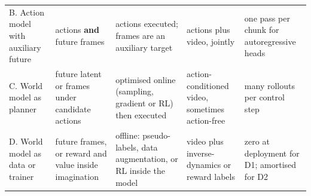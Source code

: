 \documentclass[
  10pt,
  english,
]{article}
\begin{document}
\begin{longtable}[]{@{}lllll@{}}
\begin{minipage}[t]{0.17\columnwidth}
B. Action model with auxiliary future\strut
\end{minipage} & \begin{minipage}[t]{0.17\columnwidth}\raggedright
actions \textbf{and} future frames\strut
\end{minipage} & \begin{minipage}[t]{0.17\columnwidth}\raggedright
actions executed; frames are an auxiliary target\strut
\end{minipage} & \begin{minipage}[t]{0.17\columnwidth}\raggedright
actions plus video, jointly\strut
\end{minipage} & \begin{minipage}[t]{0.17\columnwidth}\raggedright
one pass per chunk for autoregressive heads\strut
\end{minipage}\tabularnewline
\begin{minipage}[t]{0.17\columnwidth}\raggedright
C. World model as planner\strut
\end{minipage} & \begin{minipage}[t]{0.17\columnwidth}\raggedright
future latent or frames under candidate actions\strut
\end{minipage} & \begin{minipage}[t]{0.17\columnwidth}\raggedright
optimised online (sampling, gradient or RL) then executed\strut
\end{minipage} & \begin{minipage}[t]{0.17\columnwidth}\raggedright
action-conditioned video, sometimes action-free\strut
\end{minipage} & \begin{minipage}[t]{0.17\columnwidth}\raggedright
many rollouts per control step\strut
\end{minipage}\tabularnewline
\begin{minipage}[t]{0.17\columnwidth}\raggedright
D. World model as data or trainer\strut
\end{minipage} & \begin{minipage}[t]{0.17\columnwidth}\raggedright
future frames, or reward and value inside imagination\strut
\end{minipage} & \begin{minipage}[t]{0.17\columnwidth}\raggedright
offline: pseudo-labels, data augmentation, or RL inside the model\strut
\end{minipage} & \begin{minipage}[t]{0.17\columnwidth}\raggedright
video plus inverse-dynamics or reward labels\strut
\end{minipage} & \begin{minipage}[t]{0.17\columnwidth}\raggedright
zero at deployment for D1; amortised for D2\strut
\end{minipage}\tabularnewline
\bottomrule
\end{longtable}
\end{document}
